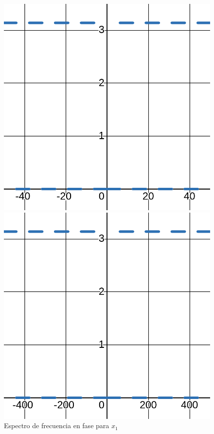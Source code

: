 \documentclass[12pt,a4paper]{report}
\begin{document}
\begin{enumerate}[label=\alph*),left=0pt]
\begin {itemize}[left=0pt]
        \begin{figure}[h!]
          \hspace{10mm}
          \begin{minipage}{0.45\textwidth}
            \centering
            \includegraphics[width=\textwidth]{images/ej3.3}
            \caption{Espectro de frecuencia en fase para $x_1$}
            \label{fig:imagen1}
          \end{minipage}
          \hfill
          \begin{minipage}{0.45\textwidth}
            \centering
            \includegraphics[width=\textwidth]{images/ej3.4}

\end{minipage}
\end{figure}
\end{itemize}
\end{enumerate}
\end{document}
